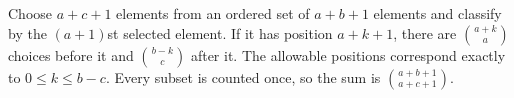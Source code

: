 Choose $a+c+1$ elements from an ordered set of $a+b+1$ elements and classify by the $(a+1)$st selected element. If it has position $a+k+1$, there are $\binom{a+k}a$ choices before it and $\binom{b-k}c$ after it. The allowable positions correspond exactly to $0\le k\le b-c$. Every subset is counted once, so the sum is $\boxed{\binom{a+b+1}{a+c+1}}$.
